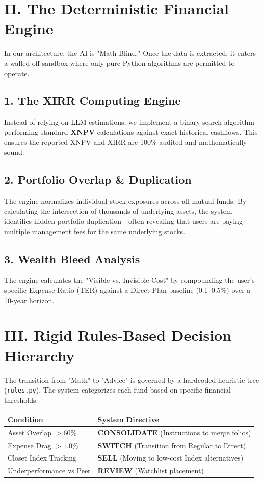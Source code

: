 \documentclass[11pt,a4paper]{article}
\begin{document}
\section{II. The Deterministic Financial Engine}
In our architecture, the AI is "Math-Blind." Once the data is extracted, it enters a walled-off sandbox where only pure Python algorithms are permitted to operate.

\subsection{1. The XIRR Computing Engine}
Instead of relying on LLM estimations, we implement a binary-search algorithm performing standard \textbf{XNPV} calculations against exact historical cashflows. This ensures the reported XNPV and XIRR are 100\% audited and mathematically sound.

\subsection{2. Portfolio Overlap \& Duplication}
The engine normalizes individual stock exposures across all mutual funds. By calculating the intersection of thousands of underlying assets, the system identifies hidden portfolio duplication—often revealing that users are paying multiple management fees for the same underlying stocks.

\subsection{3. Wealth Bleed Analysis}
The engine calculates the "Visible vs. Invisible Cost" by compounding the user's specific Expense Ratio (TER) against a Direct Plan baseline (0.1--0.5\%) over a 10-year horizon.

\section{III. Rigid Rules-Based Decision Hierarchy}
The transition from "Math" to "Advice" is governed by a hardcoded heuristic tree (\texttt{rules.py}). The system categorizes each fund based on specific financial thresholds:

\begin{table}[h!]
\centering
\small
\setlength{\tabcolsep}{4pt}
\begin{tabular}{ll}
\toprule
\textbf{Condition} & \textbf{System Directive} \\
\midrule
Asset Overlap $> 60\%$ & \textbf{CONSOLIDATE} (Instructions to merge folios) \\
Expense Drag $> 1.0\%$ & \textbf{SWITCH} (Transition from Regular to Direct) \\
Closet Index Tracking & \textbf{SELL} (Moving to low-cost Index alternatives) \\
Underperformance vs Peer & \textbf{REVIEW} (Watchlist placement) \\
\bottomrule
\end{tabular}
\end{table}
\vspace{-1ex}
\end{document}
